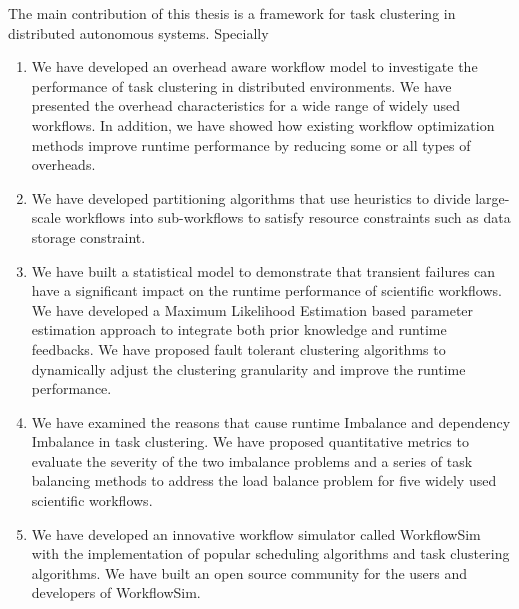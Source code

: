 The main contribution of this thesis is a framework for task clustering in distributed autonomous systems. Specially
\begin{enumerate}
\item We have developed an overhead aware workflow model to investigate the performance of task clustering in distributed environments. We have presented the overhead characteristics for a wide range of widely used workflows. In addition, we have showed how existing workflow optimization methods improve runtime performance by reducing some or all types of overheads.
\item We have developed partitioning algorithms that use heuristics to divide large-scale workflows into sub-workflows to satisfy resource constraints such as data storage constraint. 
\item We have built a statistical model to demonstrate that transient failures can have a significant impact on the runtime performance of scientific workflows. We have developed a Maximum Likelihood Estimation based parameter estimation approach to integrate both prior knowledge and runtime feedbacks. We have proposed fault tolerant clustering algorithms to dynamically adjust the clustering granularity and improve the runtime performance. 
\item We have examined the reasons that cause runtime Imbalance and dependency Imbalance in task clustering. We have proposed quantitative metrics to evaluate the severity of the two imbalance problems and a series of task balancing methods to address the load balance problem for five widely used scientific workflows. 
\item We have developed an innovative workflow simulator called WorkflowSim with the implementation of popular scheduling algorithms and task clustering algorithms. 
We have built an open source community for the users and developers of WorkflowSim. 
\end{enumerate}
 


